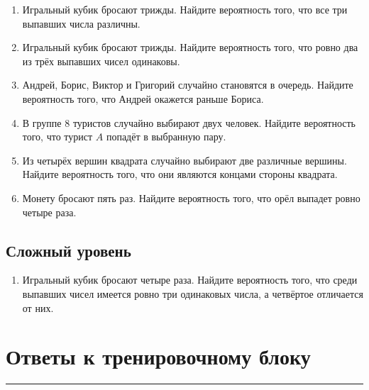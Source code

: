 \documentclass[a4paper,12pt]{article}
\newcommand{\sectionline}{%
    \vspace{0.2em}
    {\color{accent}\rule{\linewidth}{0.7pt}}
    \vspace{0.4em}
}
\begin{document}
\begin{enumerate}[leftmargin=2em,label=\textbf{\arabic*.},resume]

    \item
    Игральный кубик бросают трижды. Найдите вероятность того, что все три выпавших числа различны.

    \item
    Игральный кубик бросают трижды. Найдите вероятность того, что ровно два из трёх выпавших чисел одинаковы.

    \item
    Андрей, Борис, Виктор и Григорий случайно становятся в очередь. Найдите вероятность того, что Андрей окажется раньше Бориса.

    \item
    В группе \(8\) туристов случайно выбирают двух человек. Найдите вероятность того, что турист \(A\) попадёт в выбранную пару.

    \item
    Из четырёх вершин квадрата случайно выбирают две различные вершины. Найдите вероятность того, что они являются концами стороны квадрата.

    \item
    Монету бросают пять раз. Найдите вероятность того, что орёл выпадет ровно четыре раза.

\end{enumerate}

\subsection*{Сложный уровень}

\begin{enumerate}[leftmargin=2em,label=\textbf{\arabic*.},resume]

    \item
    Игральный кубик бросают четыре раза. Найдите вероятность того, что среди выпавших чисел имеется ровно три одинаковых числа, а четвёртое отличается от них.

\end{enumerate}


\newpage
\section*{Ответы к тренировочному блоку}
\sectionline
\end{document}
